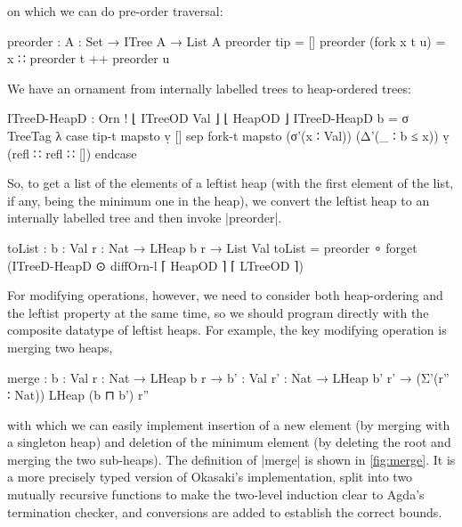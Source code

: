 on which we can do pre-order traversal:
\begin{code}
preorder : {A : Set} → ITree A → List A
preorder tip           =  []
preorder (fork x t u)  =  x ∷ preorder t ++ preorder u
\end{code}
We have an ornament from internally labelled trees to heap-ordered trees:
\begin{code}
ITreeD-HeapD : Orn ! ⌊ ITreeOD Val ⌋ ⌊ HeapOD ⌋
ITreeD-HeapD b =
  σ TreeTag λ  case  tip-t   mapsto  ṿ []
               sep   fork-t  mapsto  (σ'(x ∶ Val)) (Δ'(_ ∶ b ≤ x)) ṿ (refl ∷ refl ∷ []) endcase
\end{code}
So, to get a list of the elements of a leftist heap (with the first element of the list, if any, being the minimum one in the heap), we convert the leftist heap to an internally labelled tree and then invoke |preorder|.
\begin{code}
toList : {b : Val} {r : Nat} → LHeap b r → List Val
toList = preorder ∘ forget (ITreeD-HeapD ⊙ diffOrn-l ⌈ HeapOD ⌉ ⌈ LTreeOD ⌉)
\end{code}

For modifying operations, however, we need to consider both heap-ordering and the leftist property at the same time, so we should program directly with the composite datatype of leftist heaps.
For example, the key modifying operation is merging two heaps,
\begin{code}
merge :  {b   : Val} {r   : Nat} → LHeap b   r   →
         {b'  : Val} {r'  : Nat} → LHeap b'  r'  → (Σ'(r'' ∶ Nat)) LHeap (b ⊓ b') r''
\end{code}
with which we can easily implement insertion of a new element (by merging with a singleton heap) and deletion of the minimum element (by deleting the root and merging the two sub-heaps).
The definition of |merge| is shown in \autoref{fig:merge}.
It is a more precisely typed version of Okasaki's implementation, split into two mutually recursive functions to make the two-level induction clear to Agda's termination checker, and conversions are added to establish the correct bounds.

